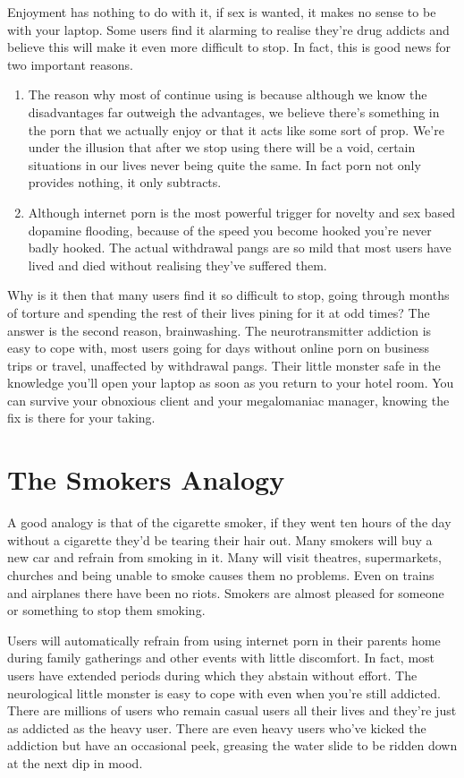\documentclass[easypeasy.tex]{subfiles}
\begin{document}
Enjoyment has nothing to do with it, if sex is wanted, it makes no sense to be with your laptop. Some users find it alarming to realise they're drug addicts and believe this will make it even more difficult to stop. In fact, this is good news for two important reasons.
    \begin{enumerate}
      \item The reason why most of continue using is because although we know the disadvantages far outweigh the advantages, we believe there's something in the porn that we actually enjoy or that it acts like some sort of prop. We're under the illusion that after we stop using there will be a void, certain situations in our lives never being quite the same. In fact porn not only provides nothing, it only subtracts.

      \item Although internet porn is the most powerful trigger for novelty and sex based dopamine flooding, because of the speed you become hooked you're never badly hooked. The actual withdrawal pangs are so mild that most users have lived and died without realising they've suffered them.
    \end{enumerate}

Why is it then that many users find it so difficult to stop, going through months of torture and spending the rest of their lives pining for it at odd times? The answer is the second reason, brainwashing. The neurotransmitter addiction is easy to cope with, most users going for days without online porn on business trips or travel, unaffected by withdrawal pangs. Their little monster safe in the knowledge you'll open your laptop as soon as you return to your hotel room. You can survive your obnoxious client and your megalomaniac manager, knowing the fix is there for your taking.

\section{The Smokers Analogy}
A good analogy is that of the cigarette smoker, if they went ten hours of the day without a cigarette they'd be tearing their hair out. Many smokers will buy a new car and refrain from smoking in it. Many will visit theatres, supermarkets, churches and being unable to smoke causes them no problems. Even on trains and airplanes there have been no riots. Smokers are almost pleased for someone or something to stop them smoking.

Users will automatically refrain from using internet porn in their parents home during family gatherings and other events with little discomfort. In fact, most users have extended periods during which they abstain without effort. The neurological little monster is easy to cope with even when you're still addicted. There are millions of users who remain casual users all their lives and they're just as addicted as the heavy user. There are even heavy users who've kicked the addiction but have an occasional peek, greasing the water slide to be ridden down at the next dip in mood.
\end{document}
